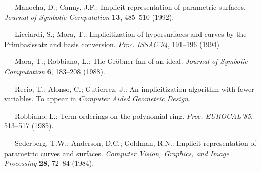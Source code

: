 {\medskip
{}\ \ \ 
Manocha, D.; Canny, J.F.:
Implicit representation of parametric surfaces.
{\em Journal of Symbolic Computation} {\bf 13},
485--510 (1992).

\medskip
{}\ \ \ 
Licciardi, S.; Mora, T.:
Implicitization of hypersurfaces and curves by the Primbasissatz and basis
conversion. {\em Proc. ISSAC'94}, 191--196 (1994).

\medskip
{}\ \ \ 
Mora, T.; Robbiano, L.:
The Gr\"obner fan of an ideal.
{\em Journal of Symbolic Computation} {\bf 6},
183--208 (1988).

\medskip
\noindent
[Recio et al.]\ \ \ 
Recio, T.; Alonso, C.; Gutierrez, J.:
An implicitization algorithm with fewer variables. To appear in
{\em Computer Aided Geometric Design}.

\medskip
\noindent
[Robbiano 1985]\ \ \ 
Robbiano, L.:
Term orderings on the polynomial ring. {\em Proc. EUROCAL'85}, 513--517 (1985).

\medskip
\noindent
[Sederberg et al. 1984]\ \ \ 
Sederberg, T.W.; Anderson, D.C.; Goldman, R.N.:
Implicit representation of parametric curves and surfaces.
{\em Computer Vision, Graphics, and Image Processing} {\bf 28}, 72--84
(1984).
}


